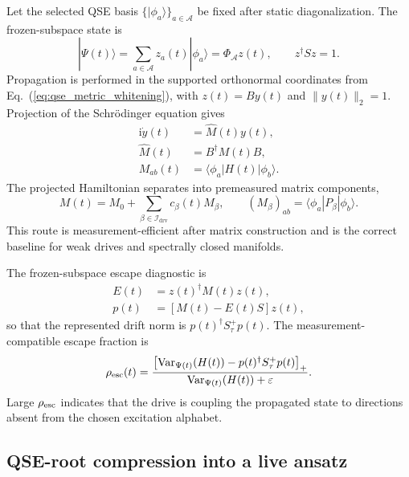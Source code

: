 \documentclass[
  reprint,
  amsmath,
  amssymb,
  aps,
  pra,
  nofootinbib,
  superscriptaddress,
  floatfix
]{revtex4-2}
\newcommand{\Acal}{\mathcal{A}}
\newcommand{\ii}{\mathrm{i}}
\newcommand{\drv}{\mathrm{drv}}
\newcommand{\Var}{\operatorname{Var}}
\newcommand{\eps}{\varepsilon}
\newcommand{\ket}[1]{|#1\rangle}
\newcommand{\bra}[1]{\langle #1|}
\begin{document}
Let the selected QSE basis $\{\ket{\phi_a}\}_{a\in\Acal}$ be fixed after static diagonalization.  The frozen-subspace state is
\begin{equation}
\ket{\Psi(t)}=\sum_{a\in\Acal}z_a(t)\ket{\phi_a}
=\Phi_\Acal z(t),
\qquad
z^\dagger S z=1.
\label{eq:frozen_qse_state}
\end{equation}
Propagation is performed in the supported orthonormal coordinates from Eq.~(\ref{eq:qse_metric_whitening}), with $z(t)=By(t)$ and $\|y(t)\|_2=1$.  Projection of the Schr\"odinger equation gives
\begin{equation}
\begin{aligned}
\ii \dot y(t)&=\widehat M(t)y(t),
\\
\widehat M(t)&=B^\dagger M(t)B,
\\
M_{ab}(t)&=\bra{\phi_a}H(t)\ket{\phi_b}.
\end{aligned}
\label{eq:frozen_qse_ode}
\end{equation}
The projected Hamiltonian separates into premeasured matrix components,
\begin{equation}
M(t)=M_0+\sum_{\beta\in\mathcal I_{\drv}}c_\beta(t)M_\beta,
\qquad
(M_\beta)_{ab}=\bra{\phi_a}P_\beta\ket{\phi_b}.
\label{eq:frozen_projected_drive}
\end{equation}
This route is measurement-efficient after matrix construction and is the correct baseline for weak drives and spectrally closed manifolds.

The frozen-subspace escape diagnostic is
\begin{equation}
\begin{aligned}
E(t)&=z(t)^\dagger M(t)z(t),\\
p(t)&=[M(t)-E(t)S]z(t),
\end{aligned}
\label{eq:frozen_escape_parts}
\end{equation}
so that the represented drift norm is $p(t)^\dagger S_\tau^+p(t)$.  The measurement-compatible escape fraction is
\begin{equation}
\rho_{\rm esc}(t)
=
\frac{
\left[
\Var_{\Psi(t)}(H(t))
-p(t)^\dagger S_\tau^+p(t)
\right]_+
}{
\Var_{\Psi(t)}(H(t))+\eps
}.
\label{eq:frozen_escape}
\end{equation}
Large $\rho_{\rm esc}$ indicates that the drive is coupling the propagated state to directions absent from the chosen excitation alphabet.

\subsection{QSE-root compression into a live ansatz}
\end{document}
